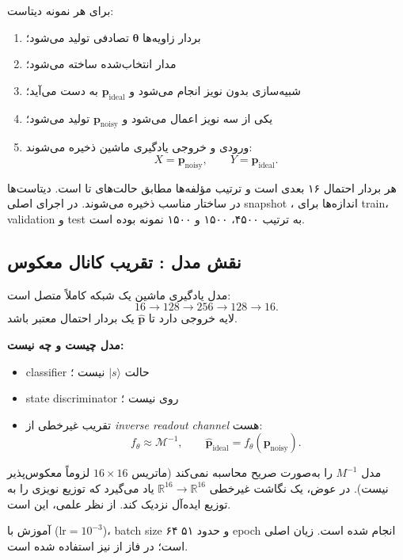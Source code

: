 برای هر نمونه دیتاست:
\begin{enumerate}
	\item بردار زاویه‌ها $\boldsymbol{\theta}$ تصادفی تولید می‌شود؛
	\item مدار انتخاب‌شده ساخته می‌شود؛
	\item شبیه‌سازی بدون نویز انجام می‌شود و $\mathbf{p}_{\mathrm{ideal}}$ به دست می‌آید؛
	\item یکی از سه نویز اعمال می‌شود و $\mathbf{p}_{\mathrm{noisy}}$ تولید می‌شود؛
	\item ورودی و خروجی یادگیری ماشین ذخیره می‌شوند:
	\[
		X=\mathbf{p}_{\mathrm{noisy}},\qquad
		Y=\mathbf{p}_{\mathrm{ideal}}.
	\]
\end{enumerate}
هر بردار احتمال ۱۶ بعدی است و ترتیب مؤلفه‌ها مطابق حالت‌های  تا  است. دیتاست‌ها در ساختار مناسب ذخیره می‌شوند. در اجرای اصلی snapshot ، اندازه‌ها برای train، validation و test به ترتیب ۴۵۰۰، ۱۵۰۰ و ۱۵۰۰ نمونه بوده است.


\subsection*{نقش مدل : تقریب کانال معکوس}

مدل یادگیری ماشین یک شبکه کاملاً متصل است:
\[
	16 \rightarrow 128 \rightarrow 256 \rightarrow 128 \rightarrow 16.
\]
لایه خروجی  دارد تا $\hat{\mathbf{p}}$ یک بردار احتمال معتبر باشد.

\textbf{مدل  چیست و چه نیست:}
\begin{itemize}
	\item  classifier حالت $|s\rangle$  نیست ؛
	\item  state discriminator روی  نیست ؛
	\item تقریب غیرخطی از \emph{inverse readout channel} هست:
	\[
		f_\theta \approx \mathcal{M}^{-1}, \qquad
		\hat{\mathbf{p}}_{\mathrm{ideal}} = f_\theta(\mathbf{p}_{\mathrm{noisy}}).
	\]
\end{itemize}

مدل $M^{-1}$ را به‌صورت صریح محاسبه نمی‌کند (ماتریس $16\times16$ لزوماً معکوس‌پذیر نیست). در عوض، یک نگاشت غیرخطی $\mathbb{R}^{16}\!\to\!\mathbb{R}^{16}$ یاد می‌گیرد که توزیع نویزی را به توزیع ایده‌آل نزدیک کند. از نظر علمی، این  است.

آموزش با  ($\text{lr}=10^{-3}$)، batch size ۶۴ و حدود ۵۱ epoch انجام شده است. زیان اصلی  است؛ در فاز  از  نیز استفاده شده است.

